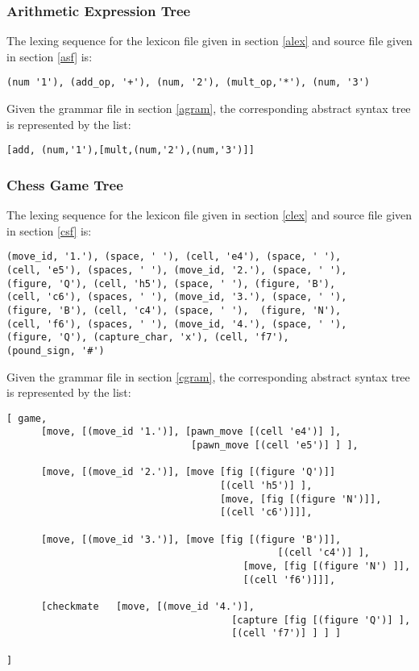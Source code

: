 \documentclass[a4paper,10pt]{article}
\def\st{\noindent}
\begin{document}
\subsubsection{Arithmetic Expression Tree}

The lexing sequence for the  lexicon file given in section \ref{alex} and source file given in section \ref{asf} is:
\begin{verbatim}
(num '1'), (add_op, '+'), (num, '2'), (mult_op,'*'), (num, '3') 
\end{verbatim}

Given the grammar file in section \ref{agram}, the corresponding abstract syntax tree is represented by the list:
\begin{verbatim}
[add, (num,'1'),[mult,(num,'2'),(num,'3')]]
\end{verbatim}
\subsubsection{Chess Game Tree}

The lexing sequence for the  lexicon file given in section \ref{clex} and source file given in section \ref{csf} is:

\begin{verbatim}
(move_id, '1.'), (space, ' '), (cell, 'e4'), (space, ' '), 
(cell, 'e5'), (spaces, ' '), (move_id, '2.'), (space, ' '), 
(figure, 'Q'), (cell, 'h5'), (space, ' '), (figure, 'B'),
(cell, 'c6'), (spaces, ' '), (move_id, '3.'), (space, ' '), 
(figure, 'B'), (cell, 'c4'), (space, ' '),  (figure, 'N'), 
(cell, 'f6'), (spaces, ' '), (move_id, '4.'), (space, ' '), 
(figure, 'Q'), (capture_char, 'x'), (cell, 'f7'),  
(pound_sign, '#')
\end{verbatim} 

\st
Given the grammar file in section \ref{cgram}, the corresponding abstract syntax tree  is represented by the list:

\begin{verbatim}
[ game,
      [move, [(move_id '1.')], [pawn_move [(cell 'e4')] ], 
                                [pawn_move [(cell 'e5')] ] ],
       
      [move, [(move_id '2.')], [move [fig [(figure 'Q')]] 
                                     [(cell 'h5')] ], 
                                     [move, [fig [(figure 'N')]], 
                                     [(cell 'c6')]]],
           
      [move, [(move_id '3.')], [move [fig [(figure 'B')]],
                                               [(cell 'c4')] ], 
                                         [move, [fig [(figure 'N') ]], 
                                         [(cell 'f6')]]],
               
      [checkmate   [move, [(move_id '4.')],
                                       [capture [fig [(figure 'Q')] ], 
                                       [(cell 'f7')] ] ] ]
               
]
\end{verbatim}



   


\end{document}
